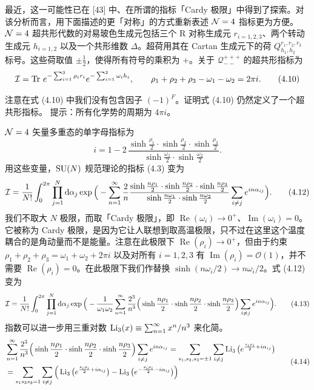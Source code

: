 最近，这一可能性已在 [43] 中、在所谓的指标「Cardy 极限」中得到了探索。对该分析而言，用下面描述的更「对称」的方式重新表述 $\mathcal{N}=4$ 指标更为方便。$\mathcal{N}=4$ 超共形代数的对易玻色生成元包括三个 R 对称生成元 $r_{i=1,2,3}$、两个转动生成元 $h_{i=1,2}$ 以及一个共形维数 $\Delta$。超荷用其在 Cartan 生成元下的荷 $Q^{r_1,r_2,r_3}_{h_1,h_2}$ 标号。这些荷取值 $\pm\frac12$，使得所有符号的乘积为 $+$。关于 $\mathcal{Q}^{+++}_{--}$ 的超共形指标为
\[
\mathcal{I}=\operatorname{Tr}\, e^{-\sum_{i=1}^{3}\rho_i r_i}e^{-\sum_{i=1}^{2}\omega_i h_i},\qquad
\rho_1+\rho_2+\rho_3-\omega_1-\omega_2=2\pi i .
\tag{4.10}
\]
\begin{exercise}[4.1]
注意在式 (4.10) 中我们没有包含因子 $(-1)^F$。证明式 (4.10) 仍然定义了一个超共形指标。
提示：所有化学势的周期为 $4\pi i$。
\end{exercise}
$\mathcal{N}=4$ 矢量多重态的单字母指标为
\[
i=1-2\,\frac{\sinh\frac{\rho_1}{2}\cdot\sinh\frac{\rho_2}{2}\cdot\sinh\frac{\rho_3}{2}}{\sinh\frac{\omega_1}{2}\cdot\sinh\frac{\omega_2}{2}} .
\tag{4.11}
\]
用这些变量，$\operatorname{SU}(N)$ 规范理论的指标 (4.3) 变为
\[
\mathcal{I}=\frac{1}{N!}\int_0^{2\pi}\prod_{j=1}^{N}\mathrm{d}\alpha_j\exp\Big(-\sum_{n=1}^{\infty}\frac2n\frac{\sinh\frac{n\rho_1}{2}\cdot\sinh\frac{n\rho_2}{2}\cdot\sinh\frac{n\rho_3}{2}}{\sinh\frac{n\omega_1}{2}\cdot\sinh\frac{n\omega_2}{2}}\sum_{i\neq j}e^{in\alpha_{ij}}\Big) .
\tag{4.12}
\]
我们不取大 $N$ 极限，而取「Cardy 极限」，即 $\operatorname{Re}(\omega_i)\to0^+$、$\operatorname{Im}(\omega_i)=0$。它被称为 Cardy 极限，是因为它让人联想到取高温极限，只不过在这里这个温度耦合的是角动量而不是能量。注意在此极限下 $\operatorname{Re}(\rho_i)\to0^+$，但由于约束 $\rho_1+\rho_2+\rho_3=\omega_1+\omega_2+2\pi i$ 以及对所有 $i=1,2,3$ 有 $\operatorname{Im}(\rho_i)=\mathcal{O}(1)$，并不需要 $\operatorname{Re}(\rho_i)=0$。在此极限下我们作替换 $\sinh(n\omega_i/2)\to n\omega_i/2$。式 (4.12) 变为
\[
\mathcal{I}=\frac{1}{N!}\int_0^{2\pi}\prod_{j=1}^{N}\mathrm{d}\alpha_j\exp\Big(-\frac{1}{\omega_1\omega_2}\sum_{n=1}^{\infty}\frac{2^3}{n^3}\Big(\sinh\frac{n\rho_1}{2}\cdot\sinh\frac{n\rho_2}{2}\cdot\sinh\frac{n\rho_3}{2}\Big)\sum_{i\neq j}e^{in\alpha_{ij}}\Big) .
\tag{4.13}
\]
指数可以进一步用三重对数 $\operatorname{Li}_3(x)\equiv\sum_{n=1}^{\infty}x^n/n^3$ 来化简。
\[
\begin{aligned}
&\sum_{n=1}^{\infty}\frac{2^3}{n^3}\Big(\sinh\frac{n\rho_1}{2}\cdot\sinh\frac{n\rho_2}{2}\cdot\sinh\frac{n\rho_3}{2}\Big)\sum_{i\neq j}e^{in\alpha_{ij}}
=\sum_{s_1,s_2,s_3=\pm1}\sum_{i\neq j}\operatorname{Li}_3\big(e^{\frac{s_i\rho_i}{2}+i\alpha_{ij}}\big)\\
&=\sum_{s_1s_2s_3=1}\sum_{i\neq j}\Big(\operatorname{Li}_3\big(e^{\frac{s_i\rho_i}{2}+i\alpha_{ij}}\big)-\operatorname{Li}_3\big(e^{-\frac{s_i\rho_i}{2}-i\alpha_{ij}}\big)\Big)
\end{aligned}
\tag{4.14}
\]
